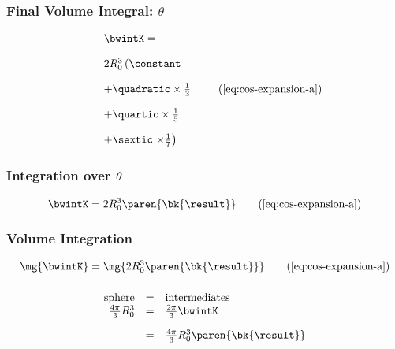 \begin{frame}\frametitle{Final Volume Integral: $\theta$}
\begin{equation}
	\begin{array}{ll}
		&\bwintK = \\[11pt]
		& 2R_{0}^{3} \left( \constant \right. \\[11pt]
		&+  \quadratic  \times \tfrac{1}{3}  \\[11pt]
		&+  \quartic  \times \tfrac{1}{5} \\[11pt]
		&+  \sextic  \left. \times \tfrac{1}{7} \right) 
	\end{array}
\tag{\ref{eq:cos-expansion-a}}
\end{equation}
\end{frame}


\begin{frame}\frametitle{Integration over $\theta$}
\begin{equation}
	\bwintK = 2 R_{0}^{3}\paren{\bk{ \result }}
\tag{\ref{eq:cos-expansion-a}}
\end{equation}
\end{frame}

\begin{frame}\frametitle{Volume Integration}
\begin{equation}
	\mg{\bwintK} = \mg{2 R_{0}^{3}\paren{\bk{ \result }}}
\tag{\ref{eq:cos-expansion-a}}
\end{equation}
\end{frame}

\begin{frame}\frametitle{}
\begin{equation}
	\begin{array}{rcl}
		\text{sphere} &=& \text{intermediates} \\
		\frac{4\pi}{3} R_{0}^{3} &=& \frac{2\pi}{3} \bwintK \\[10pt] 
		&=& \frac{4\pi}{3} R_{0}^{3}\paren{\bk{ \result }} \\
	\end{array}
\label{eq:before-after}
\end{equation}
\end{frame}


